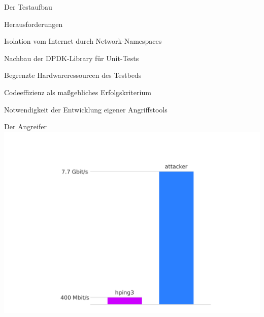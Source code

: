 \documentclass{beamer}
\begin{document}
\begin{frame}{Der Testaufbau}
\begin{center}
    \end{center}
\end{frame}

\begin{frame}{Herausforderungen}
    \center
    \begin{todolist}
        \item Isolation vom Internet durch Network-Namespaces \pause
        \item Nachbau der DPDK-Library für Unit-Tests \pause
        \item Begrenzte Hardwareressourcen des Testbeds \pause
        \item Codeeffizienz als maßgebliches Erfolgskriterium \pause
        \item Notwendigkeit der Entwicklung eigener Angriffstools
    \end{todolist}
\end{frame}

\begin{frame}{Der Angreifer}
    \includegraphics[width=\linewidth]{attackerVShping.pdf}
\end{frame}
\end{document}
